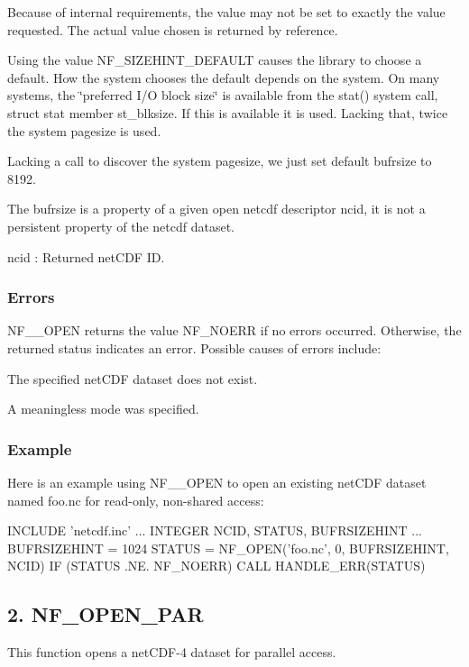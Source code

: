 Because of internal requirements, the value may not be set to exactly the value requested. The actual value chosen is returned by reference.

Using the value N\+F\+\_\+\+S\+I\+Z\+E\+H\+I\+N\+T\+\_\+\+D\+E\+F\+A\+U\+LT causes the library to choose a default. How the system chooses the default depends on the system. On many systems, the \char`\"{}preferred I/\+O block size\char`\"{} is available from the stat() system call, struct stat member st\+\_\+blksize. If this is available it is used. Lacking that, twice the system pagesize is used.

Lacking a call to discover the system pagesize, we just set default bufrsize to 8192.

The bufrsize is a property of a given open netcdf descriptor ncid, it is not a persistent property of the netcdf dataset.

{\ttfamily ncid} \+: Returned net\+C\+DF ID.

\subsubsection*{Errors}

N\+F\+\_\+\+\_\+\+O\+P\+EN returns the value N\+F\+\_\+\+N\+O\+E\+RR if no errors occurred. Otherwise, the returned status indicates an error. Possible causes of errors include\+:


\begin{DoxyItemize}
\item The specified net\+C\+DF dataset does not exist.
\item A meaningless mode was specified.
\end{DoxyItemize}

\subsubsection*{Example}

Here is an example using N\+F\+\_\+\+\_\+\+O\+P\+EN to open an existing net\+C\+DF dataset named foo.\+nc for read-\/only, non-\/shared access\+:


\begin{DoxyCode}
INCLUDE 'netcdf.inc'
 ...
INTEGER NCID, STATUS, BUFRSIZEHINT
...
BUFRSIZEHINT = 1024
STATUS = NF\_OPEN('foo.nc', 0, BUFRSIZEHINT, NCID)
IF (STATUS .NE. NF\_NOERR) CALL HANDLE\_ERR(STATUS)
\end{DoxyCode}
\hypertarget{nc_f77_interface_guide_f77_NF_OPEN_PAR}{}\subsection{2. N\+F\+\_\+\+O\+P\+E\+N\+\_\+\+P\+A\+R  }\label{nc_f77_interface_guide_f77_NF_OPEN_PAR}
This function opens a net\+C\+D\+F-\/4 dataset for parallel access.

